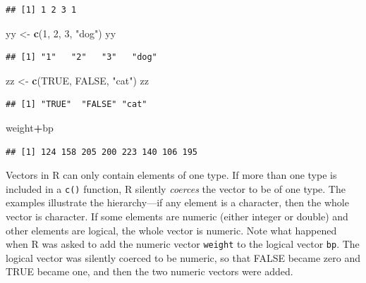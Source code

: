 \documentclass[
]{krantz}
\newenvironment{Shaded}{\begin{snugshade}}{\end{snugshade}}
\newcommand{\DecValTok}[1]{\textcolor[rgb]{0.00,0.00,0.81}{#1}}
\newcommand{\KeywordTok}[1]{\textcolor[rgb]{0.13,0.29,0.53}{\textbf{#1}}}
\newcommand{\NormalTok}[1]{#1}
\newcommand{\OperatorTok}[1]{\textcolor[rgb]{0.81,0.36,0.00}{\textbf{#1}}}
\newcommand{\OtherTok}[1]{\textcolor[rgb]{0.56,0.35,0.01}{#1}}
\newcommand{\StringTok}[1]{\textcolor[rgb]{0.31,0.60,0.02}{#1}}
\begin{document}
\begin{verbatim}
## [1] 1 2 3 1
\end{verbatim}

\begin{Shaded}
\begin{Highlighting}[]
\NormalTok{yy \textless{}{-}}\StringTok{ }\KeywordTok{c}\NormalTok{(}\DecValTok{1}\NormalTok{, }\DecValTok{2}\NormalTok{, }\DecValTok{3}\NormalTok{, }\StringTok{"dog"}\NormalTok{)}
\NormalTok{yy}
\end{Highlighting}
\end{Shaded}

\begin{verbatim}
## [1] "1"   "2"   "3"   "dog"
\end{verbatim}

\begin{Shaded}
\begin{Highlighting}[]
\NormalTok{zz \textless{}{-}}\StringTok{ }\KeywordTok{c}\NormalTok{(}\OtherTok{TRUE}\NormalTok{, }\OtherTok{FALSE}\NormalTok{, }\StringTok{"cat"}\NormalTok{)}
\NormalTok{zz}
\end{Highlighting}
\end{Shaded}

\begin{verbatim}
## [1] "TRUE"  "FALSE" "cat"
\end{verbatim}

\begin{Shaded}
\begin{Highlighting}[]
\NormalTok{weight}\OperatorTok{+}\NormalTok{bp}
\end{Highlighting}
\end{Shaded}

\begin{verbatim}
## [1] 124 158 205 200 223 140 106 195
\end{verbatim}

Vectors in R can only contain elements of one type. If more than one type is included in a \texttt{c()} function, R silently \emph{coerces} the vector to be of one type. The examples illustrate the hierarchy---if any element is a character, then the whole vector is character. If some elements are numeric (either integer or double) and other elements are logical, the whole vector is numeric. Note what happened when R was asked to add the numeric vector \texttt{weight} to the logical vector \texttt{bp}. The logical vector was silently coerced to be numeric, so that FALSE became zero and TRUE became one, and then the two numeric vectors were added.
\end{document}

